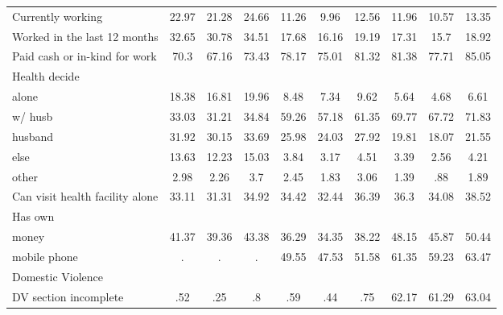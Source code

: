 \begin{tabular}{l*{9}{c}}
Currently working   &       22.97&       21.28&       24.66&       11.26&        9.96&       12.56&       11.96&       10.57&       13.35\\
Worked in the last 12 months&       32.65&       30.78&       34.51&       17.68&       16.16&       19.19&       17.31&        15.7&       18.92\\
Paid cash or in-kind for work&        70.3&       67.16&       73.43&       78.17&       75.01&       81.32&       81.38&       77.71&       85.05\\
\midrule
Health decide       &            &            &            &            &            &            &            &            &            \\
alone               &       18.38&       16.81&       19.96&        8.48&        7.34&        9.62&        5.64&        4.68&        6.61\\
w/ husb             &       33.03&       31.21&       34.84&       59.26&       57.18&       61.35&       69.77&       67.72&       71.83\\
husband             &       31.92&       30.15&       33.69&       25.98&       24.03&       27.92&       19.81&       18.07&       21.55\\
else                &       13.63&       12.23&       15.03&        3.84&        3.17&        4.51&        3.39&        2.56&        4.21\\
other               &        2.98&        2.26&         3.7&        2.45&        1.83&        3.06&        1.39&         .88&        1.89\\
Can visit health facility alone&       33.11&       31.31&       34.92&       34.42&       32.44&       36.39&        36.3&       34.08&       38.52\\
\midrule
Has own             &            &            &            &            &            &            &            &            &            \\
money               &       41.37&       39.36&       43.38&       36.29&       34.35&       38.22&       48.15&       45.87&       50.44\\
mobile phone        &           .&           .&           .&       49.55&       47.53&       51.58&       61.35&       59.23&       63.47\\
\midrule
Domestic Violence   &            &            &            &            &            &            &            &            &            \\
DV section incomplete&         .52&         .25&          .8&         .59&         .44&         .75&       62.17&       61.29&       63.04\\

\end{tabular}
